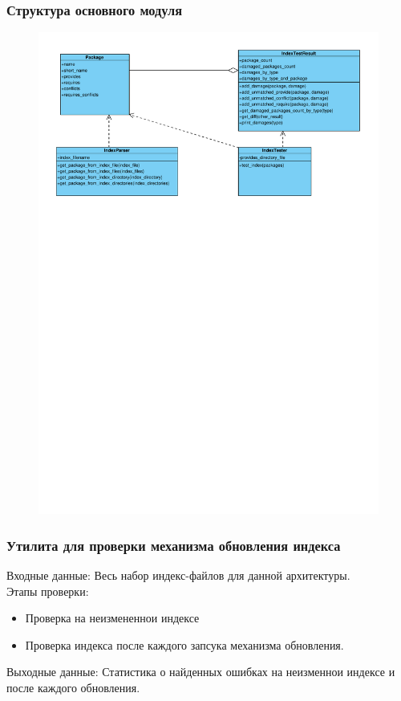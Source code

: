 \documentclass{beamer}
\begin{document}
\begin{frame}
\frametitle{Структура основного модуля}

\begin{figure}
\begin{center}
\vspace{0cm}
\hspace*{-1cm} \includegraphics[scale=0.43]{../resources/uml/ds_test_class_diagram.pdf}
\end{center}
\end{figure}

\end{frame}

\begin{frame}
\frametitle{Утилита для проверки механизма обновления индекса}
Входные данные: Весь набор индекс-файлов для данной архитектуры.\\

Этапы проверки:
\begin{itemize}
\item
Проверка на неизмененнои индексе
\item
Проверка индекса после каждого запсука механизма обновления.
\end{itemize}
Выходные данные: Статистика о найденных ошибках на неизменнои индексе
и после каждого обновления.
\end{frame}
\end{document}
